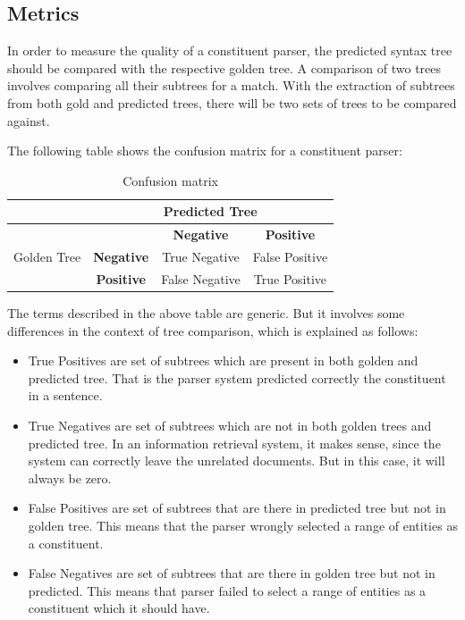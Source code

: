 \documentclass[a4paper, 11pt]{article}
\begin{document}
\subsection{Metrics}

In order to measure the quality of a constituent parser, the predicted syntax tree should be compared with the respective golden tree. A comparison of two trees involves comparing all their subtrees for a match. With the extraction of subtrees from both gold and predicted trees, there will be two sets of trees to be compared against.

The following table shows the confusion matrix for a constituent parser:

\begin{table}[h!]
  \begin{center}
    \label{tab:table1}
    \begin{tabular}{c|c|c|c}
      &  \multicolumn{3}{c}{Predicted Tree}\\
	  \hline
      \multirow{3}{*}{Golden Tree} & & \textbf{Negative} & \textbf{Positive} \\
      & \textbf{Negative} & True Negative & False Positive \\
      & \textbf{Positive} & False Negative & True Positive\\
    \end{tabular}
    \caption{Confusion matrix}
  \end{center}
\end{table}

The terms described in the above table are generic. But it involves some differences in the context of tree comparison, which is explained as follows:
\begin{itemize}
\item True Positives are set of subtrees which are present in both golden and predicted tree. That is the parser system predicted correctly the constituent in a sentence.
\item True Negatives are set of subtrees which are not in both golden trees and predicted tree. In an information retrieval system, it makes sense, since the system can correctly leave the unrelated documents. But in this case, it will always be zero.
\item False Positives are set of subtrees that are there in predicted tree but not in golden tree. This means that the parser wrongly selected a range of entities as a constituent. 
\item False Negatives are set of subtrees that are there in golden tree but not in predicted. This means that parser failed to select a range of entities as a constituent which it should have. 
\end{itemize}
\end{document}
